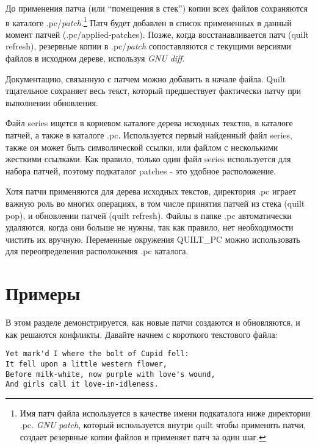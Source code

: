 \documentclass{article}
\newcommand{\quilt}[1]{\textsf{quilt #1}}
\newcommand{\prog}[1]{\textit{#1}}
\begin{document}
До применения патча (или ``помещения в стек'') копии всех файлов сохраняются в каталоге \textsf{.pc/\textit{patch}}.\footnote{
Имя патч файла используется в качестве имени подкаталога ниже директории \textsf{.pc}. \prog{GNU patch}, который используется внутри quilt чтобы применять патчи, создает резервные копии файлов и применяет патч за один шаг.} Патч будет добавлен в список примененных в данный момент патчей (\textsf{.pc/applied-patches}). Позже, когда восстанавливается патч (\quilt{refresh}), резервные копии в \textsf{.pc/\textit{patch}} сопоставляются с текущими версиями файлов в исходном дереве, используя \prog{GNU diff}.

Документацию, связанную с патчем можно добавить в начале файла. Quilt тщательное сохраняет весь текст, который предшествует фактически патчу при выполнении обновления.

Файл \textsf{series} ищется в корневом каталоге дерева исходных текстов, в каталоге патчей, а также в каталоге \textsf{.pc}. Используется первый найденный файл \textsf{series}, также он может быть символической ссылки, или файлом с несколькими жесткими ссылками. Как правило, только один файл \textsf{series} используется для набора патчей, поэтому подкаталог \textsf{patches} - это удобное расположение.

Хотя патчи применяются для дерева исходных текстов, директория \textsf{.pc} играет важную роль во многих операциях, в том числе принятия патчей из стека (\quilt{pop}), и обновлении патчей (\quilt{refresh}). Файлы в папке \textsf{.pc} автоматически удаляются, когда они больше не нужны, так как правило, нет необходимости чистить их вручную. Переменные окружения \textsf{QUILT\_PC} можно использовать для переопределения расположения \textsf{.pc} каталога.

\section{Примеры}

В этом разделе демонстрируется, как новые патчи создаются и обновляются, и как решаются конфликты. Давайте начнем с короткого текстового файла:

\begin{small}
\begin{Verbatim}
Yet mark'd I where the bolt of Cupid fell:
It fell upon a little western flower,
Before milk-white, now purple with love's wound,
And girls call it love-in-idleness.
\end{Verbatim}
\end{small}
\end{document}
